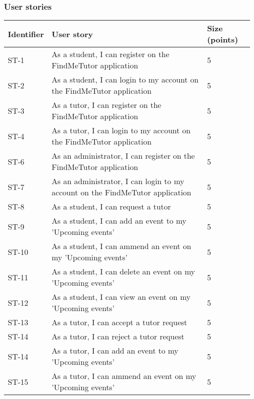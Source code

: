 \documentclass[12pt]{article}
\begin{document}
\subsubsection{User stories}
{
\centering
\begin{longtable}{| l | p{10cm}| l |}
			\hline			
			\textbf{Identifier} & \textbf{User story} & \textbf{Size (points)}
			
			\\ \hline ST-1 & As a student, I can  register on the FindMeTutor application  & 5 
			\\ \hline ST-2 & As a student, I can  login to my account on the FindMeTutor application  & 5 
			\\ \hline ST-3 & As a tutor, I can  register on the FindMeTutor application  & 5 
																\\ \hline ST-4 & As a tutor, I can  login to my account on the FindMeTutor application  & 5 
																\\ \hline ST-6 & As an administrator, I can  register on the FindMeTutor application  & 5 
													\\ \hline ST-7 & As an administrator, I can  login to my account on the FindMeTutor application  & 5 			

			\\ \hline ST-8 & As a student, I can  request a tutor  & 5 													
			\\ \hline ST-9 & As a student, I can  add an event to my 'Upcoming events'  & 5 
			
			\\ \hline ST-10 & As a student, I can  ammend an event on my 'Upcoming events'  & 5 
			
			\\ \hline ST-11 & As a student, I can  delete an event on my 'Upcoming events'  & 5 	
			
			\\ \hline ST-12 & As a student, I can  view an event on my 'Upcoming events'  & 5 
			
			\\ \hline ST-13 & As a tutor, I can  accept a tutor request  & 5 			
						
						\\ \hline ST-14 & As a tutor, I can  reject a tutor request  & 5 									
			
			\\ \hline ST-14 & As a tutor, I can  add an event to my 'Upcoming events'  & 5 
			
			\\ \hline ST-15 & As a tutor, I can  ammend an event on my 'Upcoming events'  & 5 
			

\end{longtable}}
\end{document}
